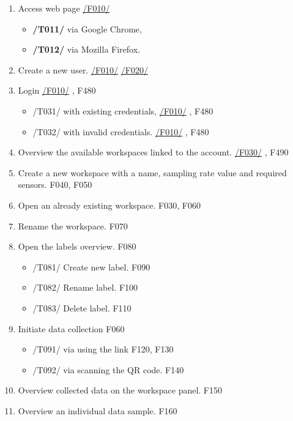 \begin{enumerate}[{label = \textbf{/T{\protect\twodigits{\arabic{enumi}}}0/}, leftmargin = *}]
    \item Access web page \hyperref[welcome_page]{/F010/}
    \begin{itemize}
        \item \textbf{/T011/} via Google Chrome,
        \item \textbf{/T012/} via Mozilla Firefox.
    \end{itemize}
    \item Create a new user. \hyperref[welcome_page]{/F010/} \hyperref[registration_panel]{/F020/}
    \item Login \hyperref[welcome_page]{/F010/} , F480
    \begin{itemize}
        \item /T031/ with existing credentials, \hyperref[welcome_page]{/F010/} , F480
        \item /T032/ with invalid credentials. \hyperref[welcome_page]{/F010/} , F480
    \end{itemize}
    \item Overview the available workspaces linked to the account. \hyperref[workspaces_ov]{/F030/} , F490
    \item Create a new workspace with a name, sampling rate value and required sensors. F040, F050 
    \item Open an already existing workspace. F030, F060
    \item Rename the workspace. F070
    \item Open the labels overview. F080
    \begin{itemize}
        \item /T081/ Create new label. F090
        \item /T082/ Rename label. F100
        \item /T083/ Delete label. F110
    \end{itemize}
    \item Initiate data collection F060
    \begin{itemize}
        \item /T091/ via using the link F120, F130
        \item /T092/ via scanning the QR code. F140
    \end{itemize}
    \item Overview collected data on the workspace panel. F150
    \item Overview an individual data sample. F160

\end{enumerate}
